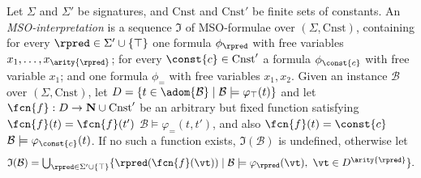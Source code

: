 \begin{definition}
Let $\Sigma$ and $\Sigma'$ be signatures, and $\mathrm{Cnst}$ and $\mathrm{Cnst}'$ be finite sets of constants. An {\em MSO-interpretation} is a sequence $\mathfrak{I}$ 
of MSO-formulae over $(\Sigma, \mathrm{Cnst})$, containing for every $\rpred \in \Sigma' \cup \{\top\}$ one formula $\phi_\rpred$ with free variables $x_1,\ldots,x_{\arity{\rpred}}$; for every $\const{c} \in \mathrm{Cnst}'$ a formula $\phi_\const{c}$ with free variable $x_1$; and one formula $\phi_=$ with free variables $x_1,x_2$.   
Given an instance $\mathcal{B}$ over $(\Sigma, \mathrm{Cnst})$, let 
$D = \{t \in \adom{\mathcal{B}} \mid \mathcal{B} \models \varphi_\top(t)\}$ and let 
$\fcn{f}: D \to \mathbf{N}\cup \mathrm{Cnst}'$ be an arbitrary but fixed function satisfying 
$\fcn{f}(t)=\fcn{f}(t')$ \iffi $\mathcal{B}\models \varphi_=(t,t')$,
and also $\fcn{f}(t)=\const{c}$ \iffi $\mathcal{B}\models \varphi_\const{c}(t)$.
If no such a function exists, $\mathfrak{I}(\mathcal{B})$ is undefined, otherwise let
$$
\mathfrak{I}(\mathcal{B})=\textstyle\bigcup_{\rpred \in \Sigma' \cup \{\top\}}\{\rpred(\fcn{f}(\vt)) \mid \mathcal{B} \models {\varphi}_{\rpred}(\vt),\ \vt \in D^{\arity{\rpred}} \}.
$$


\end{definition}
